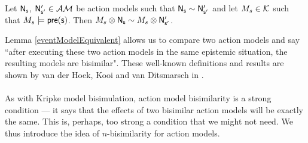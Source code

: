 \begin{lemma} \label{eventModelEquivalent}
Let $\mathrm{\mathsf{\mathrm{\mathsf{N}}_s}}$, $\mathrm{\mathsf{\mathrm{\mathsf{N}}'_{s'}}} \in \mathcal{AM}$ be action models such that $\mathrm{\mathsf{\mathrm{\mathsf{N}}_s}}
\sim \mathrm{\mathsf{\mathrm{\mathsf{N}}'_{s'}}}$
and let $M_s \in \mathcal{K}$ such that $M_s \models \mathrm{\mathsf{pre(s)}}$.
Then $M_s \otimes \mathrm{\mathsf{\mathrm{\mathsf{N}}_s}} \sim M_s \otimes \mathrm{\mathsf{\mathrm{\mathsf{N}}'_{s'}}}$.
\end{lemma}

Lemma \ref{eventModelEquivalent} allows us to compare two action models and say ``after executing
these two action models in the same epistemic situation, the resulting models are bisimilar".
These well-known definitions and results are shown by van der Hoek, Kooi and van Ditsmarsch in
\cite{hoek2008dynamic}.\\
\\
As with Kripke model bisimulation, action model bisimilarity is a strong condition --- it says that the effects of two bisimilar
action models will be exactly the same.
This is, perhaps, too strong a condition that we might not need.
We thus introduce the idea of $n$-bisimilarity for action models.

